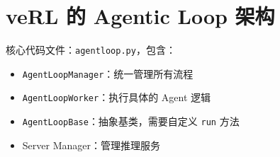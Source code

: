 \section{veRL 的 Agentic Loop 架构}
核心代码文件：\texttt{agentloop.py}，包含：
\begin{itemize}
  \item \texttt{AgentLoopManager}：统一管理所有流程
  \item \texttt{AgentLoopWorker}：执行具体的 Agent 逻辑
  \item \texttt{AgentLoopBase}：抽象基类，需要自定义 \texttt{run} 方法
  \item Server Manager：管理推理服务
\end{itemize}

